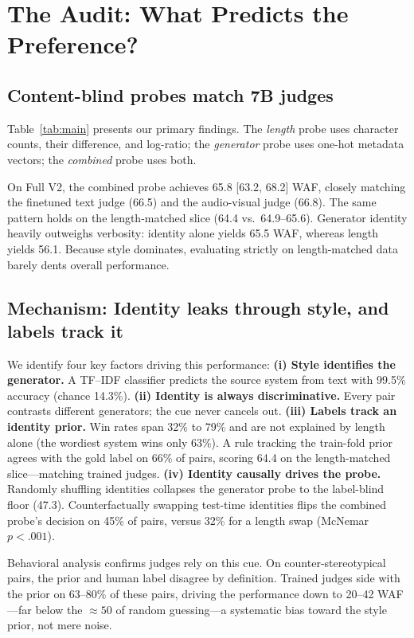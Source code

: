 \documentclass[sigconf,screen]{acmart}
\newcommand{\waf}{WAF\xspace}
\begin{document}
\section{The Audit: What Predicts the Preference?}

\subsection{Content-blind probes match 7B judges}
Table~\ref{tab:main} presents our primary findings. The \emph{length} probe uses character counts, their difference, and log-ratio; the \emph{generator} probe uses one-hot metadata vectors; the \emph{combined} probe uses both.

On Full V2, the combined probe achieves 65.8 [63.2, 68.2] \waf, closely matching the finetuned text judge (66.5) and the audio-visual judge (66.8). The same pattern holds on the length-matched slice (64.4 vs.\ 64.9--65.6). Generator identity heavily outweighs verbosity: identity alone yields 65.5 \waf, whereas length yields 56.1. Because style dominates, evaluating strictly on length-matched data barely dents overall performance.

\subsection{Mechanism: Identity leaks through style, and labels track it}
\label{sec:mechanism}
We identify four key factors driving this performance:
\textbf{(i) Style identifies the generator.} A TF--IDF classifier predicts the source system from text with 99.5\% accuracy (chance 14.3\%).
\textbf{(ii) Identity is always discriminative.} Every pair contrasts different generators; the cue never cancels out.
\textbf{(iii) Labels track an identity prior.} Win rates span 32\% to 79\% and are not explained by length alone (the wordiest system wins only 63\%). A rule tracking the train-fold prior agrees with the gold label on 66\% of pairs, scoring 64.4 on the length-matched slice---matching trained judges.
\textbf{(iv) Identity causally drives the probe.} Randomly shuffling identities collapses the generator probe to the label-blind floor (47.3). Counterfactually swapping test-time identities flips the combined probe's decision on 45\% of pairs, versus 32\% for a length swap (McNemar~\cite{mcnemar1947note} $p < .001$). 

Behavioral analysis confirms judges rely on this cue. On counter-stereotypical pairs, the prior and human label disagree by definition. Trained judges side with the prior on 63--80\% of these pairs, driving the performance down to 20--42 \waf---far below the ${\approx}50$ of random guessing---a systematic bias toward the style prior, not mere noise.
\end{document}
